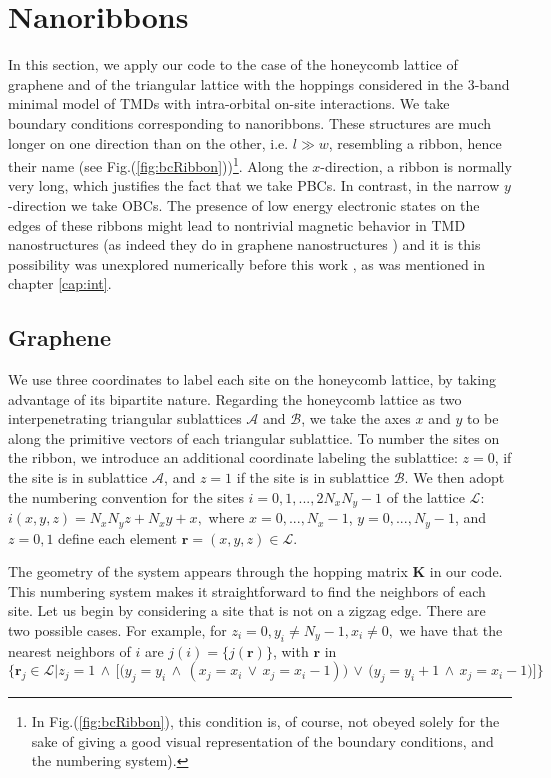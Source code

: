 \section{Nanoribbons}
\label{sec:nanoribbon}

In this section, we apply our code to the case of the honeycomb lattice of graphene and of the triangular lattice with the hoppings considered in the 3-band minimal model of \acs{TMD}s with intra-orbital on-site interactions.
We take boundary conditions corresponding to nanoribbons.
These structures are much longer on one direction than on the other, i.e. $l \gg w$, resembling a ribbon, hence their name (see Fig.(\ref{fig:bcRibbon}))\footnote{In Fig.(\ref{fig:bcRibbon}), this condition is, of course, not obeyed solely for the sake of giving a good visual representation of the boundary conditions, and the numbering system).}.
Along the $x$-direction, a ribbon is normally very long, which justifies the fact that we take \acp{PBC}.
In contrast, in the narrow $y$-direction we take \acp{OBC}.
The presence of low energy electronic states on the edges of these ribbons might lead to nontrivial magnetic behavior in \ac{TMD} nanostructures (as indeed they do in graphene nanostructures \cite{yazyev_emergence_2010}) and it is this possibility was unexplored numerically before this work \cite{feldner_dynamical_2011, golor_quantum_2013}, as was mentioned in chapter \ref{cap:int}.

\subsection{Graphene}
\label{sec:graphene}

We use three coordinates to label each site on the honeycomb lattice, by taking advantage of its bipartite nature.
Regarding the honeycomb lattice as two interpenetrating triangular sublattices $\mathcal{A}$ and $\mathcal{B}$, we take the axes $x$ and $y$ to be along the primitive vectors of each triangular sublattice.
To number the sites on the ribbon, we introduce an additional coordinate labeling the sublattice: $z = 0$, if the site is in sublattice $\mathcal{A}$, and $z = 1$ if the site is in sublattice $\mathcal{B}$.
We then adopt the numbering convention for the sites $i = 0,1, ..., 2 N_x N_y - 1$ of the lattice $\mathcal{L}$:
$
i (x, y, z) = N_x N_y z + N_x y + x,
$
 where $x = 0, ..., N_x - 1$, $y = 0, ..., N_y - 1$, and $z = 0, 1$ define each element $\bm r = (x, y, z) \in \mathcal{L}$.

The geometry of the system appears through the hopping matrix $\bm K$ in our code.
This numbering system makes it straightforward to find the neighbors of each site.
Let us begin by considering a site that is not on a zigzag edge.
There are two possible cases. For example, for 
$
z_i = 0, y_i \neq N_y - 1, x_i \neq 0 ,
$
 we have that the nearest neighbors of $i$ are $ j (i) = \{ j ( \bm r) \}$, with $\bm r$ in
\begin{equation*}
\bigg\{ \bm r_j \in \mathcal{L} \bigg| z_j = 1 \,\land\, \bigg[ \bigg( y_j = y_i  \,\land\, ( x_j = x_i \,\lor\, x_j = x_i - 1) \bigg) \,\lor\, \bigg( y_j = y_i + 1  \,\land\, x_j = x_i - 1  \bigg)  \bigg] \bigg\}
\end{equation*}

